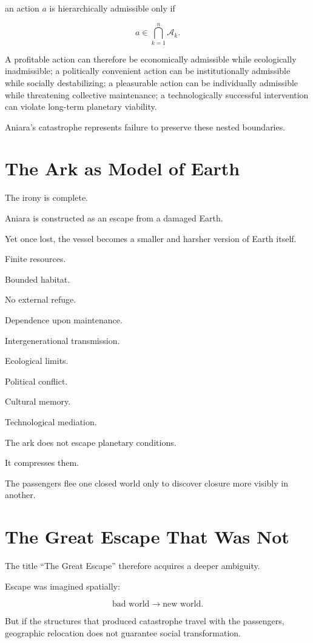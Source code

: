 \documentclass[11pt,oneside]{book}
\theoremstyle{definition}
\theoremstyle{remark}
\newcommand{\A}{\mathcal{A}}
\begin{document}
an action \(a\) is hierarchically admissible only if

\[
a\in
\bigcap_{k=1}^{n}
\A_k.
\]

A profitable action can therefore be economically admissible while ecologically inadmissible; a politically convenient action can be institutionally admissible while socially destabilizing; a pleasurable action can be individually admissible while threatening collective maintenance; a technologically successful intervention can violate long-term planetary viability.

Aniara's catastrophe represents failure to preserve these nested boundaries.

\section{The Ark as Model of Earth}

The irony is complete.

Aniara is constructed as an escape from a damaged Earth.

Yet once lost, the vessel becomes a smaller and harsher version of Earth itself.

Finite resources.

Bounded habitat.

No external refuge.

Dependence upon maintenance.

Intergenerational transmission.

Ecological limits.

Political conflict.

Cultural memory.

Technological mediation.

The ark does not escape planetary conditions.

It compresses them.

The passengers flee one closed world only to discover closure more visibly in another.

\section{The Great Escape That Was Not}

The title ``The Great Escape'' therefore acquires a deeper ambiguity.

Escape was imagined spatially:

\[
\text{bad world}
\rightarrow
\text{new world}.
\]

But if the structures that produced catastrophe travel with the passengers, geographic relocation does not guarantee social transformation.
\end{document}
